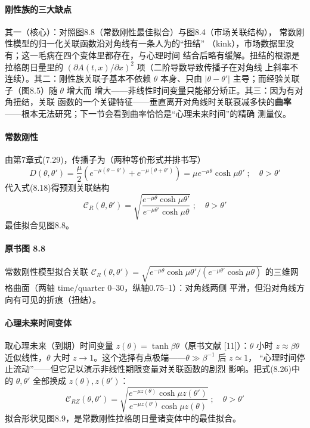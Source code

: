 \paragraph{刚性族的三大缺点}
其一（核心）：对照图8.8（常数刚性最佳拟合）与图8.4（市场关联结构），
常数刚性模型的归一化关联函数沿对角线有一条人为的“扭结”
（kink），市场数据里没有；这一毛病在四个变体里都存在，与心理时间
结合后略有缓解。扭结的根源是拉格朗日量里的
$(\partial A(t,x)/\partial x)^{2}$ 项（二阶导数导致传播子在对角线
上斜率不连续）。其二：刚性族关联子基本不依赖 $\theta$ 本身、只由
$|\theta-\theta'|$ 主导；而经验关联子（图8.5）随 $\theta$ 增大而
增大——非线性时间变量只能部分矫正。其三：因为有对角扭结，关联
函数的一个关键特征——垂直离开对角线时关联衰减多快的\textbf{曲率}
——根本无法研究；下一节会看到曲率恰恰是“心理未来时间”的精确
测量仪。

\paragraph{常数刚性}
由第7章式(7.29)，传播子为（两种等价形式并排书写）
\begin{equation*}
D(\theta,\theta')=\frac{\mu}{2}\left(e^{-\mu(\theta-\theta')}
+e^{-\mu(\theta+\theta')}\right)
=\mu e^{-\mu\theta}\cosh\mu\theta'\;;\quad\theta>\theta'
\tag{8.25}
\end{equation*}
代入式(8.18)得预测关联结构
\begin{equation*}
\mathcal{C}_{R}(\theta,\theta')=
\sqrt{\frac{e^{-\mu\theta}\cosh\mu\theta'}
{e^{-\mu\theta'}\cosh\mu\theta}}\;;\quad\theta>\theta'
\tag{8.26}
\end{equation*}
最佳拟合见图8.8。
\paragraph{原书图 8.8}\quad 常数刚性模型拟合关联
$\mathcal{C}_{R}(\theta,\theta')
=\sqrt{e^{-\mu\theta}\cosh\mu\theta'/\left(e^{-\mu\theta'}\cosh\mu\theta\right)}$
的三维网格曲面（两轴 time/quarter 0--30，纵轴0.75--1）：对角线两侧
平滑，但沿对角线方向有可见的折痕（扭结）。

\paragraph{心理未来时间变体}
取心理未来（到期）时间变量 $z(\theta)=\tanh\beta\theta$（原书文献
[11]）：$\theta$ 小时 $z\approx\beta\theta$ 近似线性，$\theta$ 大时
$z\to1$。这个选择有点极端——$\theta\gg\beta^{-1}$ 后 $z\simeq1$，
“心理时间停止流动”——但它足以演示非线性期限变量对关联函数的剧烈
影响。把式(8.26)中的 $\theta,\theta'$ 全部换成 $z(\theta),z(\theta')$：
\begin{equation*}
\mathcal{C}_{RZ}(\theta,\theta')=
\sqrt{\frac{e^{-\mu z(\theta)}\cosh\mu z(\theta')}
{e^{-\mu z(\theta')}\cosh\mu z(\theta)}}\;;\quad\theta>\theta'
\tag{8.27}
\end{equation*}
拟合形状见图8.9，是常数刚性拉格朗日量诸变体中的最佳拟合。
